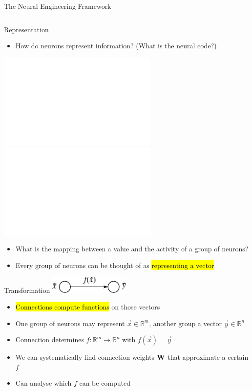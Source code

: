 \documentclass[handout,aspectratio=169]{beamer}
\begin{document}
\begin{frame}{The Neural Engineering Framework}
\begin{columns}
	\end{columns}
\end{frame}

\begin{frame}{Representation}
	\begin{itemize}
	\item How do neurons represent information? (What is the neural code?)
	\end{itemize}
	\vspace{0.25cm}
	\begin{overlayarea}{\textwidth}{6cm}
		\centering
		\includegraphics<2->[height=4.75cm]{media/hafting_et_al_2005_grid_cells.pdf}~~%
		\includegraphics<2->[height=4.75cm]{media/eliasmith_et_al_2003_orientation_tuning.pdf}\\
		\begin{itemize}
			\item<2-> What is the mapping between a value and the activity of a group of neurons?
			\item<3-> Every group of neurons can be thought of as \hl{representing a vector}
		\end{itemize}
	\end{overlayarea}
	\vspace{0.125cm}
\end{frame}

\begin{frame}{Transformation}
	\vspace{0.25cm}
	\centering
	\includegraphics[width=0.3\textwidth]{media/network.pdf}\\[0.5cm]
	\begin{itemize}
		\setlength{\itemsep}{0.25cm}
		\item \hl{Connections compute functions} on those vectors
		\item<2-> One group of neurons may represent $\vec x \in \mathbb{R}^m$, another group a vector $\vec y \in \mathbb{R}^n$
		\item<3-> Connection determines $f : \mathbb{R}^m \rightarrow \mathbb{R}^n$ with $f(\vec x) = \vec y$
		\item<4-> We can systematically find connection weights ${\mathbf{W}}$ that approximate a certain $f$
		\item<5-> Can analyse which $f$ can be computed
	\end{itemize}
\end{frame}
\end{document}
